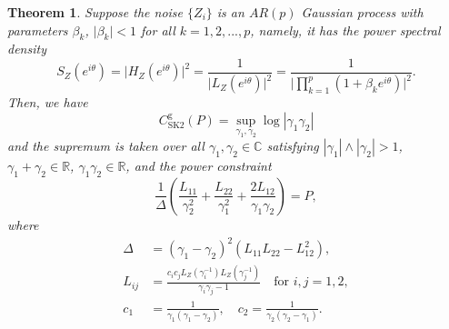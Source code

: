 \documentclass[12pt]{article}
\newtheorem{thm}{Theorem}[section]
\begin{document}
\begin{thm}\label{main-theorem-sk2}
Suppose the noise $\{ Z_i \}$ is an $AR(p)$ Gaussian process with parameters $\beta_k$, $\vert \beta_k\vert<1$ for all $k=1,2,...,p$, namely, it has the power spectral density
\begin{equation*}
S_Z(e^{i\theta}) = \vert H_Z(e^{i\theta}) \vert^2 = \frac{1}{\vert L_Z(e^{i\theta}) \vert^2} = \frac{1}{\vert\prod_{k=1}^{p}(1+\beta_ke^{i\theta})\vert^2}.
\end{equation*}
Then, we have
\begin{equation}\label{I-SK2-thm}
C^\mathrm{g}_{\mathrm{SK2}}(P) =\sup_{\gamma_1,\gamma_2} \log  |\gamma_1\gamma_2|
\end{equation}
and the supremum is taken over all $\gamma_1,\gamma_2\in\mathbb{C}$ satisfying $|\gamma_1|\wedge|\gamma_2|>1$, $\gamma_1+\gamma_2\in \mathbb{R}$, $\gamma_1\gamma_2\in\mathbb{R}$, and the power constraint 
\begin{equation}\label{power-eqn-sk2-thm}
\frac{1}{\Delta}\left( \frac{L_{11}}{\gamma^2_2}+\frac{L_{22}}{\gamma_1^2} +\frac{2L_{12}}{\gamma_1\gamma_2}  \right)= P,
\end{equation}
where 
\begin{equation}\label{main-thm-notations}
\begin{aligned}
\Delta &= (\gamma_1-\gamma_2)^2(L_{11}L_{22}-L_{12}^2),\\
L_{ij} &=\frac{c_{i}c_{j}L_Z(\gamma_i^{-1})L_Z(\gamma_j^{-1})}{\gamma_i\gamma_j-1} \quad \mbox{for $i,j=1,2,$}\\
c_1 &= \frac{1}{\gamma_1(\gamma_1-\gamma_2)}, \quad c_2 = \frac{1}{\gamma_2(\gamma_2-\gamma_1)}.
\end{aligned}
\end{equation}
\end{thm}
\end{document}
